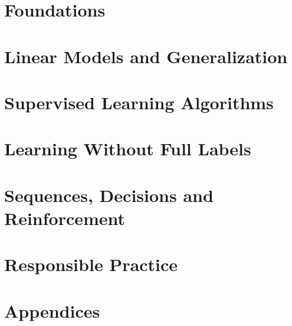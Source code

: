 \documentclass[11pt,a4paper,oneside]{report}
\begin{document}


\part{Foundations}






\part{Linear Models and Generalization}






\part{Supervised Learning Algorithms}








\part{Learning Without Full Labels}





\part{Sequences, Decisions and Reinforcement}





\part{Responsible Practice}




\appendix
\part*{Appendices}






\end{document}
